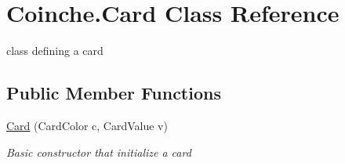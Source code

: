 \hypertarget{class_coinche_1_1_card}{}\section{Coinche.\+Card Class Reference}
\label{class_coinche_1_1_card}


class defining a card  


\subsection*{Public Member Functions}
\begin{DoxyCompactItemize}
\item 
\hyperlink{class_coinche_1_1_card_a9605eece142f74828e18131057a3d180}{Card} (Card\+Color c, Card\+Value v)
\begin{DoxyCompactList}\small\item\em Basic constructor that initialize a card \end{DoxyCompactList}\end{DoxyCompactItemize}
